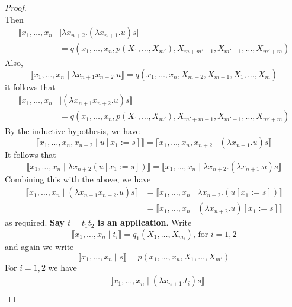 \documentclass[12pt]{article}
\theoremstyle{plain}
\theoremstyle{definition}
\begin{document}
\begin{proof}
\begin{equation}
		\end{equation}
	Then
	\begin{align*}
		\llbracket x_1, \ldots, x_n &\mid \lambda x_{n+2}. (\lambda x_{n+1}.u)s \rrbracket\\
		&= q(x_1, \ldots, x_n, p(X_1, \ldots, X_{m'}), X_{m + m' + 1}, X_{m' + 1}, \ldots, X_{m' + m})
		\end{align*}
	Also,
	\begin{equation}
		\llbracket x_1, \ldots, x_n \mid \lambda x_{n+1}x_{n+2}. u \rrbracket = q(x_1, \ldots, x_n, X_{m+2}, X_{m+1}, X_1, \ldots, X_m)
		\end{equation}
	it follows that
	\begin{align*}
		\llbracket x_1, \ldots, x_n &\mid (\lambda x_{n+1}x_{n+2}.u)s \rrbracket\\
		&= q(x_1, \ldots, x_n, p(X_1, \ldots, X_{m'}), X_{m' + m + 1}, X_{m' + 1}, \ldots, X_{m' + m})
		\end{align*}
	By the inductive hypothesis, we have
	\begin{equation}
		\llbracket x_1, \ldots, x_n, x_{n+2} \mid u[x_{1} := s] \rrbracket = 
		\llbracket x_1, \ldots, x_n, x_{n+2} \mid (\lambda x_{n+1}.u)s \rrbracket
		\end{equation}
	It follows that
	\begin{equation}
		\llbracket x_1, \ldots, x_n \mid \lambda x_{n+2}(u[x_1 := s])\rrbracket = \llbracket x_1, \ldots, x_n \mid \lambda x_{n+2}.(\lambda x_{n+1}.u)s\rrbracket
		\end{equation}
	Combining this with the above, we have
	\begin{align*}
		\llbracket x_1, \ldots, x_n \mid (\lambda x_{n+1}x_{n+2}.u)s \rrbracket &= \llbracket x_1, \ldots, x_n \mid \lambda x_{n+2}.(u[x_1 := s])\rrbracket\\
		&= \llbracket x_1, \ldots, x_n \mid (\lambda x_{n+2}. u)[x_1 := s]\rrbracket
		\end{align*}
	as required.
	\textbf{Say $t = t_1t_2$ is an application}. Write
	\begin{equation}
		\llbracket x_1, \ldots, x_n\mid t_i\rrbracket = q_1(X_1, \ldots, X_{m_i})\text{, for }i = 1,2
		\end{equation}
	and again we write
	\begin{equation}
		\llbracket x_1, \ldots, x_n \mid s \rrbracket = p(x_1, \ldots, x_n, X_1, \ldots, X_{m'})
		\end{equation}
	For $i = 1, 2 $ we have
	\begin{align*}
		&\llbracket x_1, \ldots, x_n \mid (\lambda x_{n+1}. t_i)s\rrbracket\\

\end{align*}
\end{proof}
\end{document}
